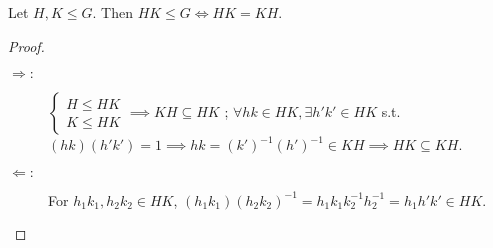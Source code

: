 \begin{prop}
  Let $H, K \le G$. Then $HK \le G \iff HK = KH$.
  \begin{proof} \mbox{}
    \begin{description}
      \item[$\Rightarrow:$] $\begin{cases} H \le HK \\ K \le HK \end{cases}
          \implies KH \subseteq HK$ ;
          $\forall hk \in HK, \exists h'k' \in HK$ s.t. $(hk)(h'k') = 1 \implies
          hk = (k')^{-1}(h')^{-1} \in KH \implies HK \subseteq KH$.
      \item[$\Leftarrow:$] For $h_1k_1, h_2k_2 \in HK$, $(h_1k_1)(h_2k_2)^{-1}
        = h_1k_1k_2^{-1}h_2^{-1} = h_1h'k' \in HK$.
    \end{description}
  \end{proof}
\end{prop}

